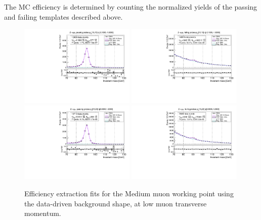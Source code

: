 {The MC efficiency is determined by counting the normalized yields of the passing and failing templates described above.
\begin{figure}
\centering
\includegraphics[width=0.49\textwidth]{figures/Zmm_RecoTemplate_BkgLPi_pass_ptBin0_etaBin1.pdf}
\includegraphics[width=0.49\textwidth]{figures/Zmm_RecoTemplate_BkgLPi_fail_ptBin0_etaBin1.pdf}
\includegraphics[width=0.49\textwidth]{figures/Zmm_RecoTemplate_BkgLPi_pass_ptBin1_etaBin9.pdf}
\includegraphics[width=0.49\textwidth]{figures/Zmm_RecoTemplate_BkgLPi_fail_ptBin1_etaBin9.pdf}
\caption{Efficiency extraction fits for the Medium muon working point using the data-driven background shape, at low muon transverse momentum.}

\end{figure}}
